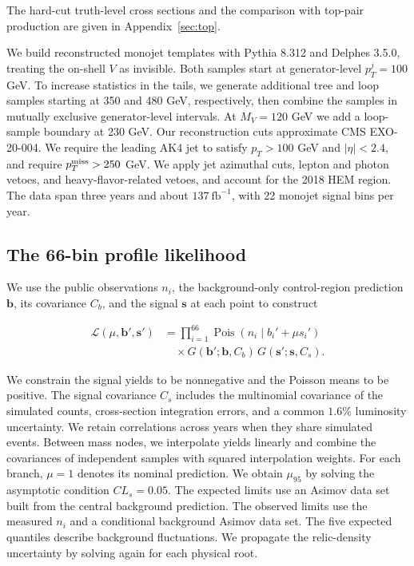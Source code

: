 \documentclass[aps,prd,reprint,superscriptaddress,longbibliography,floatfix]{revtex4-2}
\begin{document}
The hard-cut truth-level cross sections and the comparison with top-pair production are given in Appendix~\ref{sec:top}. \cite{cox2016,alwall2014,hirschi2015}

We build reconstructed monojet templates with Pythia 8.312 and Delphes 3.5.0, treating the on-shell $V$ as invisible. Both samples start at generator-level $p_T^j=100$ GeV. To increase statistics in the tails, we generate additional tree and loop samples starting at 350 and 480 GeV, respectively, then combine the samples in mutually exclusive generator-level intervals. At $M_V=120$ GeV we add a loop-sample boundary at 230 GeV. Our reconstruction cuts approximate CMS EXO-20-004. We require the leading AK4 jet to satisfy $p_T>100$ GeV and $|\eta|<2.4$, and require $p_T^{\rm miss}>250$ GeV. We apply jet azimuthal cuts, lepton and photon vetoes, and heavy-flavor-related vetoes, and account for the 2018 HEM region. The data span three years and about $137\ \mathrm{fb}^{-1}$, with 22 monojet signal bins per year. \cite{pythia2022,delphes2014,cmsmonojet,albert2021}

\subsection{The 66-bin profile likelihood}

We use the public observations $n_i$, the background-only control-region prediction $\mathbf b$, its covariance $C_b$, and the signal $\mathbf s$ at each point to construct

\begin{equation}
\label{eq:likelihood}
\begin{aligned}
\mathcal L(\mu,\mathbf b',\mathbf s') &=
\prod_{i=1}^{66}\operatorname{Pois}(n_i\mid b_i'+\mu s_i')\\
&\quad\times G(\mathbf b';\mathbf b,C_b)\,G(\mathbf s';\mathbf s,C_s).
\end{aligned}
\end{equation}

We constrain the signal yields to be nonnegative and the Poisson means to be positive. The signal covariance $C_s$ includes the multinomial covariance of the simulated counts, cross-section integration errors, and a common $1.6\%$ luminosity uncertainty. We retain correlations across years when they share simulated events. Between mass nodes, we interpolate yields linearly and combine the covariances of independent samples with squared interpolation weights. For each branch, $\mu=1$ denotes its nominal prediction. We obtain $\mu_{95}$ by solving the asymptotic condition $CL_s=0.05$. The expected limits use an Asimov data set built from the central background prediction. The observed limits use the measured $n_i$ and a conditional background Asimov data set. The five expected quantiles describe background fluctuations. We propagate the relic-density uncertainty by solving again for each physical root. \cite{cmscovariance,cmsyields,cmssimplified,cowan2011,read2002}
\end{document}
